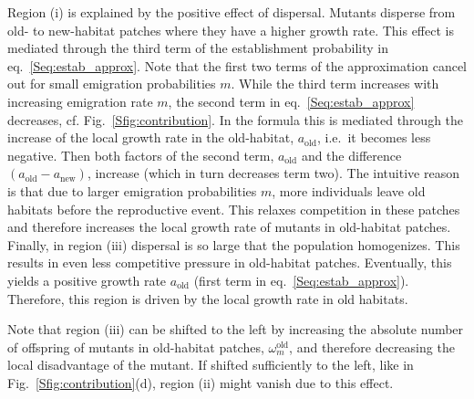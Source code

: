 \documentclass[11pt]{article}
\newcommand{\chg}[1]{\textcolor{change}{#1}}
\begin{document}
Region (i) is explained by the positive effect of dispersal. Mutants disperse from old- to new-habitat patches where they \chg{have a higher growth rate}. This effect is mediated through the third term of the establishment probability in eq.~\eqref{Seq:estab_approx}. \chg{Note that the first two terms of the approximation cancel out for small emigration probabilities $m$.}
While the third term increases with increasing emigration rate $m$, the second term in eq.~\eqref{Seq:estab_approx} decreases, cf. Fig.~\ref{Sfig:contribution}. 
In the formula this is mediated through \chg{the increase of the local growth rate in the old-habitat, $a_{\text{old}}$, i.e.\ it becomes less negative. Then both factors of the second term, $a_{\text{old}}$ and the difference $(a_{\text{old}}-a_{\text{new}})$, increase (which in turn decreases term two). The }\chg{intuitive} reason is that due to larger emigration probabilities $m$, more individuals leave old habitats before the reproductive event. This relaxes competition in these patches and therefore increases the local growth rate of mutants in old-habitat patches.   
%
Finally, in region (iii) dispersal is so large that the population homogenizes. This results in even less competitive pressure in old-habitat patches. Eventually, this yields a positive growth rate $a_{\text{old}}$ (first term in eq.~\eqref{Seq:estab_approx}). Therefore, this region is driven by the local growth rate in old habitats.

Note that region (iii) can be shifted to the left by increasing the absolute number of offspring of mutants in old-habitat patches, $\omega^\text{old}_m$, and therefore decreasing the local disadvantage of the mutant. If shifted sufficiently to the left, like in Fig.~\ref{Sfig:contribution}(d), region (ii) might vanish due to this effect.
\end{document}
